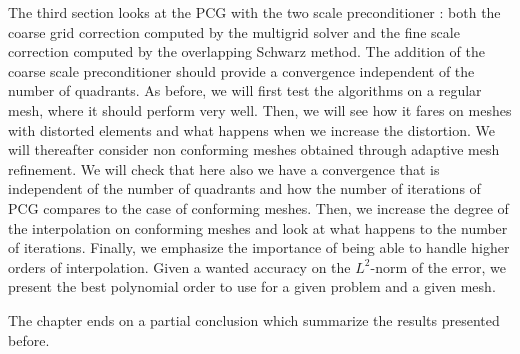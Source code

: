 The third section looks at the PCG with the two scale preconditioner : both the coarse grid correction computed by the multigrid solver and the fine scale correction computed by the overlapping Schwarz method. The addition of the coarse scale preconditioner should provide a convergence independent of the number of quadrants. As before, we will first test the algorithms on a regular mesh, where it should perform very well. Then, we will see how it fares on meshes with distorted elements and what happens when we increase the distortion. We will thereafter consider non conforming meshes obtained through adaptive mesh refinement. We will check that here also we have a convergence that is independent of the number of quadrants and how the number of iterations of PCG compares to the case of conforming meshes. Then, we increase the degree of the interpolation on conforming meshes and look at what happens to the number of iterations. Finally, we emphasize the importance of being able to handle higher orders of interpolation. Given a wanted accuracy on the $L^2$-norm of the error, we present the best polynomial order to use for a given problem and a given mesh. 

The chapter ends on a partial conclusion which summarize the results presented before.

  